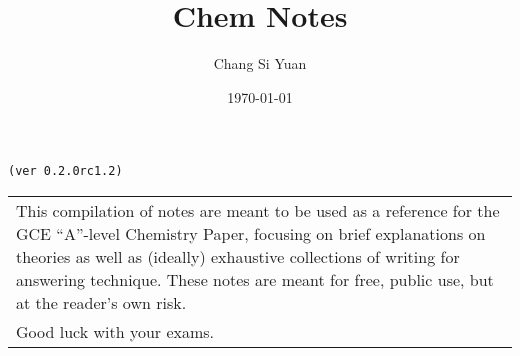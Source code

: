 \documentclass[../main]{subfiles}
\begin{document}
\author{Chang Si Yuan}
\title{Chem Notes}
\date{\today}

\maketitle

\begin{center}

	\texttt{(ver 0.2.0rc1.2)}

	\vspace{50pt}

	\begin{tabular}{>{\flushleft}p{8cm}}
	This compilation of notes are meant to be used as a reference for the GCE ``A''-level Chemistry Paper, focusing on brief explanations on theories as well as (ideally) exhaustive collections of writing for answering technique. These notes are meant for free, public use, but at the reader's own risk. \\
	Good luck with your exams.
	\end{tabular}

\end{center}

\newpage
\end{document}
